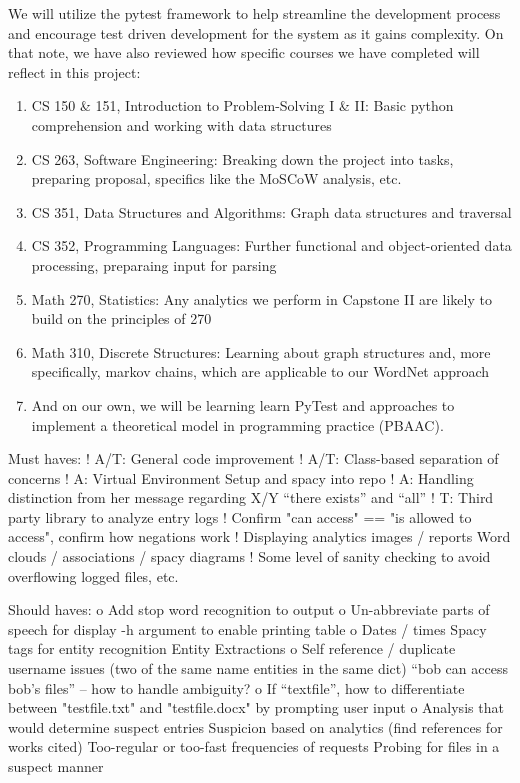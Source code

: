 \documentclass[12pt]{article}
\begin{document}
We will utilize the pytest framework to help streamline the development process and encourage test driven development for the system as it gains complexity. On that note, we have also reviewed how specific courses we have completed will reflect in this project:
\begin{enumerate}
    \item CS 150 \& 151, Introduction to Problem-Solving I \& II: Basic python comprehension and working with data structures
    \item CS 263, Software Engineering: Breaking down the project into tasks, preparing proposal, specifics like the MoSCoW analysis, etc.
    \item CS 351, Data Structures and Algorithms: Graph data structures and traversal
    \item CS 352, Programming Languages: Further functional and object-oriented data processing, preparaing input for parsing
    \item Math 270, Statistics: Any analytics we perform in Capstone II are likely to build on the principles of 270
    \item Math 310, Discrete Structures: Learning about graph structures and, more specifically, markov chains, which are applicable to our WordNet approach
    \item And on our own, we will be learning learn PyTest and approaches to implement a theoretical model in programming practice (PBAAC).
\end{enumerate}

Must haves:
!  A/T: General code improvement
!  A/T: Class-based separation of concerns
!  A: Virtual Environment Setup and spacy into repo
!  A: Handling distinction from her message regarding X/Y “there exists” and “all”
!  T: Third party library to analyze entry logs
!  Confirm "can access" == "is allowed to access", confirm how negations work
!  Displaying analytics images / reports
Word clouds / associations / spacy diagrams
!  Some level of sanity checking to avoid overflowing logged files, etc.

Should haves:
o  Add stop word recognition to output
o  Un-abbreviate parts of speech for display
-h argument to enable printing table
o  Dates / times
Spacy tags for entity recognition
Entity Extractions
o  Self reference / duplicate username issues (two of the same name entities in the same dict)
“bob can access bob’s files” -- how to handle ambiguity?
o  If “textfile”, how to differentiate between "testfile.txt" and "testfile.docx" by prompting user input
o  Analysis that would determine suspect entries
Suspicion based on analytics (find references for works cited)
Too-regular or too-fast frequencies of requests
Probing for files in a suspect manner
\end{document}
